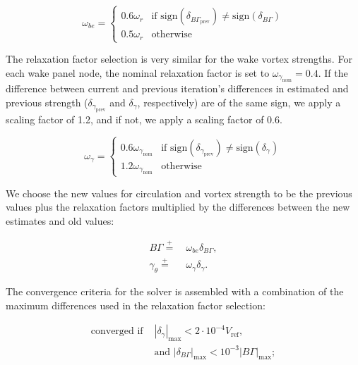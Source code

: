 \begin{equation}
    \label{eqn:circulationrelaxation}
    \omega_{be} =
    \begin{cases}
        0.6 \omega_r & \text{if } \text{sign}(\delta_{B\Gamma_\text{prev}}) \neq \text{sign}(\delta_{B\Gamma}) \\
        0.5 \omega_r & \text{otherwise}
    \end{cases}
\end{equation}

The relaxation factor selection is very similar for the wake vortex strengths.
%
For each wake panel node, the nominal relaxation factor is set to \(\omega_{\gamma_\text{nom}} = 0.4\).
%
If the difference between current and previous iteration's differences in estimated and previous strength (\(\delta_{\gamma_\text{prev}}\) and \(\delta_\gamma\), respectively) are of the same sign, we apply a scaling factor of 1.2, and if not, we apply a scaling factor of 0.6.

\begin{equation}
    \label{eqn:gammathetarelaxation}
    \omega_\gamma =
    \begin{cases}
        0.6\omega_{\gamma_\text{nom}} &\text{if } \text{sign}(\delta_{\gamma_\text{prev}}) \neq \text{sign}(\delta_{\gamma}) \\
        1.2\omega_{\gamma_\text{nom}} & \text{otherwise}
    \end{cases}
\end{equation}

We choose the new values for circulation and vortex strength to be the previous values plus the relaxation factors multiplied by the differences between the new estimates and old values:

\begin{align}
    \label{eqn:updatecirculation}
    B\Gamma \stackrel{+}{=}&~ \omega_{be} \delta_{B\Gamma}, \\
    \label{eqn:updategammatheta}
    \gamma_\theta \stackrel{+}{=}&~ \omega_\gamma \delta_\gamma.
\end{align}

The convergence criteria for the solver is assembled with a combination of the maximum differences used in the relaxation factor selection:

\begin{equation}
    \label{eqn:convergencecrit}
    \begin{aligned}
        \text{converged if } &|\delta_\gamma|_\text{max} < 2\cdot10^{-4} V_\text{ref}, \\
    &\text{and  } |\delta_{B\Gamma}|_\text{max} < 10^{-3}|B\Gamma|_\text{max};
    \end{aligned}
\end{equation}

